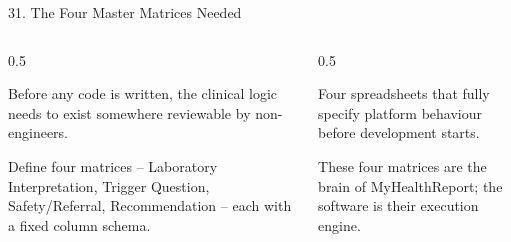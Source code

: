 \documentclass[9pt,aspectratio=169]{beamer}
\begin{document}
\begin{frame}{31. The Four Master Matrices Needed}
\begin{columns}[T,onlytextwidth]
\begin{column}{0.5\textwidth}
\begin{tcolorbox}[colback=blue!7,colframe=blue!55!black,title=\textbf{Motivation},boxrule=0.6pt,arc=1mm,left=5pt,right=5pt,top=3pt,bottom=3pt,fonttitle=\small]
\footnotesize Before any code is written, the clinical logic needs to exist somewhere reviewable by non-engineers.
\end{tcolorbox}
\vspace{5pt}
\begin{tcolorbox}[colback=teal!7,colframe=teal!55!black,title=\textbf{Method},boxrule=0.6pt,arc=1mm,left=5pt,right=5pt,top=3pt,bottom=3pt,fonttitle=\small]
\footnotesize Define four matrices -- Laboratory Interpretation, Trigger Question, Safety/Referral, Recommendation -- each with a fixed column schema.
\end{tcolorbox}
\end{column}
\begin{column}{0.5\textwidth}
\begin{tcolorbox}[colback=green!8,colframe=green!45!black,title=\textbf{Result},boxrule=0.6pt,arc=1mm,left=5pt,right=5pt,top=3pt,bottom=3pt,fonttitle=\small]
\footnotesize Four spreadsheets that fully specify platform behaviour before development starts.
\end{tcolorbox}
\vspace{5pt}
\begin{tcolorbox}[colback=orange!10,colframe=orange!65!black,title=\textbf{Conclusion},boxrule=0.6pt,arc=1mm,left=5pt,right=5pt,top=3pt,bottom=3pt,fonttitle=\small]
\footnotesize These four matrices are the brain of MyHealthReport; the software is their execution engine.
\end{tcolorbox}
\end{column}
\end{columns}
\end{frame}
\end{document}
